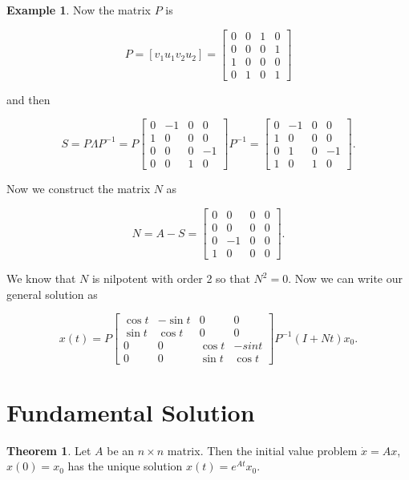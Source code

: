 \documentclass[12pt]{article}
\theoremstyle{definition}
\newtheorem*{example}{Example}
\newtheorem{theorem}{Theorem}[section]  %
\begin{document}
\begin{example}
Now the matrix $P$ is

\[
P = [v_1 u_1 v_2 u_2] =
\begin{bmatrix}
0 & 0 & 1 & 0 \\
0 & 0 & 0 & 1 \\
1 & 0 & 0 & 0 \\
0 & 1 & 0 & 1
\end{bmatrix}
\]

and then

\[
S = P \Lambda P^{-1} =
P
\begin{bmatrix}
0 & -1 & 0 & 0 \\
1 & 0 & 0 & 0 \\
0 & 0 & 0 & -1 \\
0 & 0 & 1 & 0
\end{bmatrix}
P^{-1}
=
\begin{bmatrix}
0 & -1 & 0 & 0 \\
1 & 0 & 0 & 0 \\
0 & 1 & 0 & -1 \\
1 & 0 & 1 & 0
\end{bmatrix}.
\]

Now we construct the matrix $N$ as

\[
N = A - S = 
\begin{bmatrix}
0 & 0 & 0 & 0 \\
0 & 0 & 0 & 0 \\
0 & -1 & 0 & 0 \\
1 & 0 & 0 & 0
\end{bmatrix}.
\]

We know that $N$ is nilpotent with order 2 so that $N^2 = 0$. Now we can write our
general solution as

\[
x(t) = P
\begin{bmatrix}
\cos t & -\sin t & 0 & 0 \\
\sin t & \cos t & 0 & 0 \\
0 & 0 & \cos t & -sin t \\
0 & 0 & \sin t & \cos t
\end{bmatrix}
P^{-1} (I + Nt) x_0.
\]

\end{example}

\section{Fundamental Solution}

\begin{theorem}
Let $A$ be an $n \times n$ matrix. Then the initial value problem $\dot x = Ax$, $x(0) = x_0$ has the unique solution
$x(t) = e^{At}x_0$.
\end{theorem}
\end{document}
